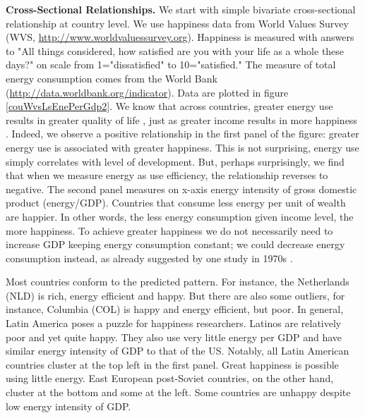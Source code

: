 \documentclass[10pt, letterpaper]{article}
\begin{document}
\begin{spacing}{1.4}
\textbf{Cross-Sectional Relationships.} We start with simple bivariate cross-sectional relationship at country level. %
We use happiness data from World Values Survey
(WVS, \url{http://www.worldvaluessurvey.org}).  Happiness is measured with answers to
"All things considered, how satisfied are you with your life as a whole these
days?" on scale from 1="dissatisfied" to 10="satisfied."
The measure of total energy  consumption comes from the World Bank
(\url{http://data.worldbank.org/indicator}). %
% 
%
Data are plotted in figure \ref{couWvsLsEnePerGdp2}. We know that across
 countries, greater energy use results in greater quality of life
 \cite{mazur11}, just as greater income results in more happiness
 \cite{aok12inc}. Indeed, we observe a positive relationship in the first panel of the figure: greater
 energy use is associated with greater happiness. This is not
 surprising, energy use simply correlates with level of development. But, perhaps
 surprisingly,  we find that when we measure energy as use efficiency, the relationship reverses to
 negative.  The second panel
 measures on x-axis energy intensity of gross domestic product  (energy/GDP). %
 Countries that  consume less
 energy per unit of wealth are happier. In other words, the less energy
 consumption 
 given income level, the more happiness.  To achieve greater happiness we
 do not necessarily need to increase GDP keeping energy consumption constant; we could
 decrease energy consumption instead, as already suggested by one study  in 1970s \cite{mazur74}. 

Most countries conform to the predicted pattern. 
 For instance,  the Netherlands (NLD) is rich,  energy efficient and happy. But
 there are also some outliers, for instance,  Columbia (COL) is  happy and energy
 efficient,  but poor.  
In general, Latin America poses a puzzle for happiness researchers. Latinos are
relatively poor and yet quite happy. They also use very little  energy per
 GDP and have similar energy intensity of GDP to that of the  US. Notably, all Latin
 American countries cluster at the top left in the
first panel.  Great happiness is possible using little  energy. East European
post-Soviet countries, on the other hand, cluster at the bottom and some at the
left. Some countries are unhappy despite low energy intensity of GDP.   


\end{spacing}
\end{document}
